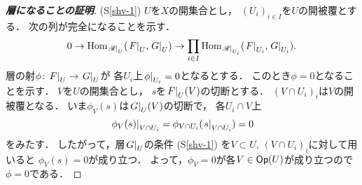 \begin{proof}[\textbf{層になることの証明}]
    (S\ref{shv-1}) 
    \(U\)を\(X\)の開集合とし，
    \(\left(U_i\right)_{i\in I}\)を\(U\)の開被覆とする．
    次の列が完全になることを示す．
    \[
        0\to \Hom_{\mres[\scR]{U}}(\mres[F]{U},\mres[G]{U})
        \to \prod_{i\in I}\Hom_{\mres[\scR]{U_i}}(\mres[F]{U_i},\mres[G]{U_i}).
    \]
    層の射\(\phi\colon \mres[F]{U}\to \mres[G]{U}\)が
    各\(U_i\)上\(\mres[\phi]{U_i}=0\)となるとする．
    このとき\(\phi=0\)となることを示す．
    \(V\)を\(U\)の開集合とし，
    \(s\)を\(\mres[F]{U}(V)\)の切断とする．
    \((V\cap U_i)_i\)は\(V\)の開被覆となる．
    いま\(\phi_V(s)\)は\(\mres[G]{U}(V)\)の切断で，
    各\(U_i\cap V\)上\[
        \mres[\phi_V(s)]{V\cap U_i}
        =\phi_{V\cap U_i}(\mres[s]{V\cap U_i})
        =0
    \]をみたす．
    したがって，層\(\mres[G]{U}\)の条件 (S\ref{shv-1}) を\(V\subset U\), 
    \(\left(V\cap U_i\right)_i\)に対して用いると
    \(\phi_{V}(s)=0\)が成り立つ．
    よって，\(\phi_V=0\)が各\(V\in\Op(U)\)が成り立つので\(\phi=0\)である．


\end{proof}

